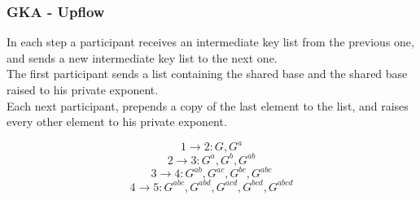 \begin{frame}
  \frametitle{GKA - Upflow}
  In each step a participant receives an intermediate key list from the previous one, and sends a new intermediate key list to the next one.\\[0.3cm]

  The first participant sends a list containing the shared base and the shared base raised to his private exponent.\\[0.3cm]

  Each next participant, prepends a copy of the last element to the list, and raises every other element to his private exponent.\\[0.3cm]

  \begin{minipage}{.47\textwidth}
    \[ 1 \rightarrow 2: G, G^a \]
    \[ 2 \rightarrow 3: G^a, G^b, G^{ab} \]
    \[ 3 \rightarrow 4: G^{ab}, G^{ac}, G^{bc}, G^{abc} \]
    \[ 4 \rightarrow 5: G^{abc}, G^{abd}, G^{acd}, G^{bcd}, G^{abcd} \]
  \end{minipage}
  \begin{minipage}{.47\textwidth}
   \begin{figure}
    \end{figure}
  \end{minipage}
\end{frame}

